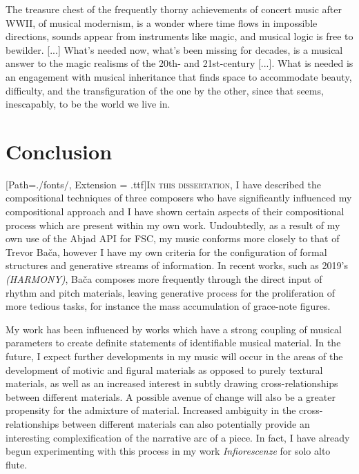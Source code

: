 \begin{savequote}[75mm]
The treasure chest of the frequently thorny achievements of concert music after WWII, of musical modernism, is a wonder where time flows in impossible directions, sounds appear from instruments like magic, and musical logic is free to bewilder. [...] What's needed now, what's been missing for decades, is a musical answer to the magic realisms of the 20th- and 21st-century [...]. What is needed is an engagement with musical inheritance that finds space to accommodate beauty, difficulty, and the transfiguration of the one by the other, since that seems, inescapably, to be the world we live in.
\end{savequote}

\chapter{Conclusion}
\label{conclusion}


\lettrine[lines=3]{\setmainfont{GoudyInitialen}[Path=./fonts/, Extension = .ttf]\color{printGreen}I}{n this dissertation}, I have described the compositional techniques of three composers who have significantly influenced my compositional approach and I have shown certain aspects of their compositional process which are present within my own work. Undoubtedly, as a result of my own use of the Abjad \ac{API} for \ac{FSC}, my music conforms more closely to that of Trevor Bača, however I have my own criteria for the configuration of formal structures and generative streams of information. In recent works, such as 2019's \textit{(HARMONY)}, Bača composes more frequently through the direct input of rhythm and pitch materials, leaving generative process for the proliferation of more tedious tasks, for instance the mass accumulation of grace-note figures.

My work has been influenced by works which have a strong coupling of musical parameters to create definite statements of identifiable musical material. In the future, I expect further developments in my music will occur in the areas of the development of motivic and figural materials as opposed to purely textural materials, as well as an increased interest in subtly drawing cross-relationships between different materials. A possible avenue of change will also be a greater propensity for the admixture of material. Increased ambiguity in the cross-relationships between different materials can also potentially provide an interesting complexification of the narrative arc of a piece. In fact, I have already begun experimenting with this process in my work \textit{Infiorescenze} for solo alto flute.

